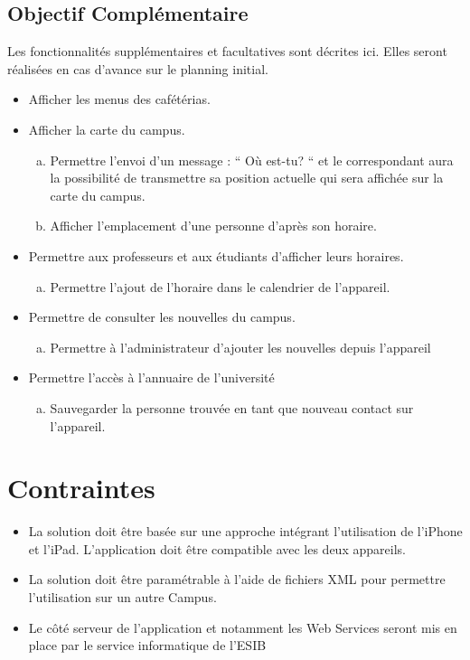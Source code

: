 \subsection{ Objectif Complémentaire}
Les fonctionnalités supplémentaires et facultatives sont décrites ici. Elles seront réalisées en cas d'avance sur le planning initial.
\begin{itemize}
	\item Afficher les menus des cafétérias.
	\item Afficher la carte du campus.
	\begin{enumerate}[a)]
		\item Permettre l'envoi d'un message : `` Où est-tu?  `` et le correspondant aura la possibilité de transmettre sa position actuelle qui sera affichée sur la carte du campus.
		\item Afficher l'emplacement d'une personne d'après son horaire.
	\end{enumerate}
	\item Permettre aux professeurs et aux étudiants d'afficher leurs horaires.
	\begin{enumerate}[a)]
		\item Permettre l'ajout de l'horaire dans le calendrier de l'appareil.
	\end{enumerate}
	\item Permettre de consulter les nouvelles du campus.
		\begin{enumerate}[a)]
			\item Permettre à l'administrateur d'ajouter les nouvelles depuis l'appareil 
		\end{enumerate}
	\item Permettre l'accès à l'annuaire de l'université 
		\begin{enumerate}[a)]
			\item Sauvegarder la personne trouvée en tant que nouveau contact sur l'appareil.
		\end{enumerate}
\end{itemize}
\section{Contraintes}
\begin{itemize}
	\item La solution doit être basée sur une approche intégrant l'utilisation de l'iPhone et l'iPad. L'application doit être compatible avec les deux appareils.
	\item La solution doit être paramétrable à l'aide de fichiers XML pour permettre l'utilisation sur un autre Campus.
	\item Le côté serveur de l'application et notamment les Web Services seront mis en place par le service informatique de l'\gls{ESIB}  
\end{itemize}



